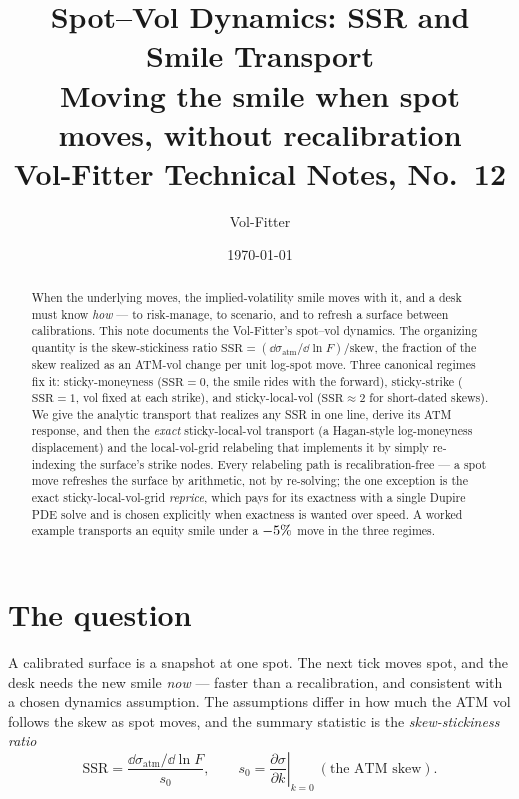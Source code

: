 \documentclass[11pt]{article}
\title{\textbf{Spot--Vol Dynamics: SSR and Smile Transport}\\[2pt]
\large Moving the smile when spot moves, without recalibration\\[2pt]
\normalsize Vol-Fitter Technical Notes, No.~12}
\author{Vol-Fitter}
\date{\today}
\begin{document}
\maketitle


\begin{abstract}
When the underlying moves, the implied-volatility smile moves with it, and a desk
must know \emph{how} --- to risk-manage, to scenario, and to refresh a surface
between calibrations. This note documents the Vol-Fitter's spot--vol dynamics. The
organizing quantity is the skew-stickiness ratio
$\mathrm{SSR}=(\dd\sigma_{\text{atm}}/\dd\ln F)/\text{skew}$, the fraction of the
skew realized as an ATM-vol change per unit log-spot move. Three canonical regimes
fix it: sticky-moneyness ($\mathrm{SSR}=0$, the smile rides with the forward),
sticky-strike ($\mathrm{SSR}=1$, vol fixed at each strike), and sticky-local-vol
($\mathrm{SSR}\approx2$ for short-dated skews). We give the analytic transport that
realizes any SSR in one line, derive its ATM response, and then the \emph{exact}
sticky-local-vol transport (a Hagan-style log-moneyness displacement) and the
local-vol-grid relabeling that implements it by simply re-indexing the surface's
strike nodes. Every relabeling path is recalibration-free --- a spot move refreshes
the surface by arithmetic, not by re-solving; the one exception is the exact
sticky-local-vol-grid \emph{reprice}, which pays for its exactness with a single
Dupire PDE solve and is chosen explicitly when exactness is wanted over speed. A
worked example transports an equity smile under a $-5\%$ move in the three
regimes.
\end{abstract}

\tableofcontents
\newpage

\section{The question}
\label{sec:question}

A calibrated surface is a snapshot at one spot. The next tick moves spot, and the
desk needs the new smile \emph{now} --- faster than a recalibration, and consistent
with a chosen dynamics assumption. The assumptions differ in how much the ATM vol
follows the skew as spot moves, and the summary statistic is the
\emph{skew-stickiness ratio}
\begin{equation}
\mathrm{SSR}=\frac{\dd\sigma_{\text{atm}}/\dd\ln F}{s_0},
\qquad s_0=\left.\frac{\partial\sigma}{\partial k}\right|_{k=0}\ (\text{the ATM skew}).
\label{eq:ssr}
\end{equation}
\end{document}
